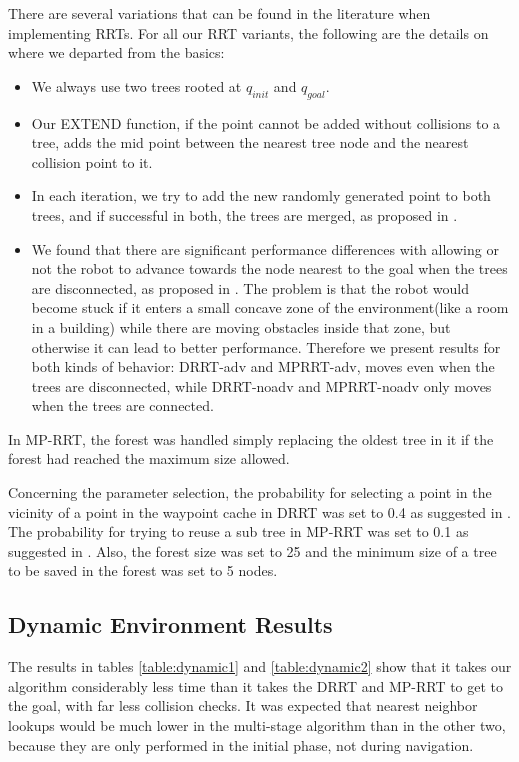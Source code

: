 \documentclass[10pt, conference, compsoc]{IEEEtran}
\begin{document}
There are several variations that can be found in the literature when 
implementing RRTs. For all our RRT variants, the following are the details on
where we departed from the basics:
\begin{itemize}
\item We always use two trees rooted at $q_{init}$ and $q_{goal}$.
\item Our EXTEND function, if the point cannot be added without collisions to a
tree, adds the mid point between the nearest tree node and the nearest collision
point to it.
\item In each iteration, we try to add the new randomly generated point to both
trees, and if successful in both, the trees are merged, as proposed in
\cite{Kuffner00}.
\item We found that there are significant performance differences with allowing
or not the robot to
advance towards the node nearest to the goal when the trees are disconnected, as
proposed in \cite{Zucker07}. The problem is that the robot would become stuck
if it enters a small concave zone of the environment(like a room in a building)
while there are moving obstacles inside that zone, but otherwise it can lead to
    better performance. Therefore we present results for both kinds of behavior:
    DRRT-adv and MPRRT-adv, moves even when the trees are disconnected, while
    DRRT-noadv and MPRRT-noadv only
moves when the trees are connected.
\end{itemize}
In MP-RRT, the forest was handled simply replacing the oldest tree in it if the
forest had reached the maximum size allowed.

Concerning the parameter selection, the probability for selecting a point in the
vicinity of a point in the waypoint cache in DRRT was set to 0.4 as suggested in 
\cite{Ferguson06}. The probability for trying to reuse a sub tree in 
MP-RRT was set to 0.1 as suggested in \cite{Zucker07}. 
Also, the forest size was set to 25 and the minimum size of a
tree to be saved in the forest was set to 5 nodes.

\subsection{Dynamic Environment Results}
The results in tables \ref{table:dynamic1} and \ref{table:dynamic2} show that it takes 
our algorithm considerably less time than it takes the DRRT and MP-RRT to get to
the goal, with far less collision checks. It was expected that nearest neighbor
lookups would be much lower in the multi-stage algorithm than in the other two,
because they are only performed in the initial phase, not during navigation.
\end{document}
